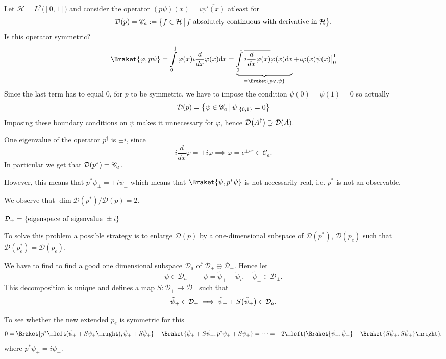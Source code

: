 \documentclass[12pt]{article}
\numberwithin{equation}{section}
\theoremstyle{plain}
\theoremstyle{plain}
\renewcommand{\d}{\mathrm{d}\hspace{-0.025cm}}
\renewcommand{\phi}{\varphi}
\begin{document}
\begin{example*}
	Let $\mathcal H = L^2 \big( [0,1]\big)$ and consider the operator $(p\psi)(x) = i \overline{\psi'(x)}$ atleast for \[
	\mathcal D(p) = \mathscr C_a := \mleft\{ f \in \mathcal H \, \big| \, f \text{ absolutely continuous with derivative in } \mathcal H \mright\}.	
	\] Is this operator symmetric?	
	\[
		\Braket{\phi,p\psi}=\int\limits_0^1 \bar\phi(x) i \frac{d}{d x} \phi(x) \d x = \underbrace{ \int\limits_0^1 \overline{i \frac{d}{d x} \phi(x)} \phi(x) \d x	}_{ = \Braket{p\phi,\psi}} + i \bar \phi(x) \psi(x) \big|_{0}^1
	\]
	Since the last term has to equal 0, for $p$ to be symmetric, we have to impose the condition $\psi(0) = \psi(1) = 0$ so actually 
	\[
		\mathcal D(p) = \mleft\{ \psi \in \mathscr C_{a} \, \big| \, \psi|_{\{0,1\}} = 0 \mright\} 	
	\]
	Imposing these boundary conditions on $\psi$ makes it unnecessary for $\phi$, hence $\mathcal D\mleft(A^{\dagger}\mright) \supsetneq \mathcal D(A)$.
	
	One eigenvalue of the operator $p^{\dagger}$ is $\pm i$, since
	\[
		i \frac{d}{d x} \phi = \pm i \phi	\implies \phi = e^{\pm i x} \in \mathscr C_a.
	\]
	In particular we get that $\mathcal D \mleft(p^*\mright) = \mathscr C_a$.
	
	However, this means that $p^* \psi_{\pm} = \pm i \psi_{\pm}$	which means that $\Braket{\psi,p^*\psi}$ is not necessarily real, i.e. $p^*$ is not an observable. 
	
	We observe that $\dim \mathcal{D}(p^*)/\mathcal{D}(p) = 2$.
	
	$\mathcal D_{\pm} = \mleft\{ \text{eigenspace of eigenvalue }\pm i \mright\}$
	
\end{example*}

To solve this problem a possible strategy is to enlarge $\mathcal D(p)$ by a one-dimensional subspace of $\mathcal{D}(p^*)$, $\mathcal D(p_e)$ such that $\mathcal D(p_e^*) = \mathcal D (p_e)$.

We have to find to find a good one dimensional subspace $\mathcal D_a$ of $\mathcal D_+ \oplus \mathcal{D}_-$. Hence let 
\[
	\psi \in \mathcal D_a \; \qquad \psi = \tilde \psi_+ + \tilde \psi_i, \quad \tilde\psi_{\pm} \in \mathcal D_{\pm}.
\]
This decomposition is unique and defines a map $S: \mathcal D_+ \rightarrow \mathcal{D}_-$ such that
\[
	\tilde\psi_+ \in\mathcal{D}_+ \implies \tilde\psi_+ + S\mleft( \tilde\psi_+ \mright) \in \mathcal D_a.
\]

To see whether the new extended $p_e$ is symmetric for this
\[
	0 = \Braket{p^* \mleft(\tilde\psi_+ + S \tilde\psi_+  \mright) , \tilde\psi_+ + S\tilde\psi_+ } - \Braket{ \tilde\psi_+ + S\tilde\psi_+ , p^* \tilde\psi_+ + S\tilde\psi_+} = \cdots = -2 \mleft( \Braket{\tilde\psi_+,\tilde\psi_+} - \Braket{S\tilde\psi_+,S\tilde\psi_+} \mright),
\]
	where $p^* \psi_+ = i \psi_+$.
	
\end{document}
